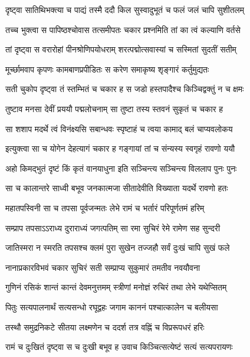 \twolineshloka
{दृष्ट्वा सातिथिभक्त्या च पाद्यं तस्मै ददौ किल}
{सुस्वादुभूतं च फलं जलं चापि सुशीतलम्} %

\twolineshloka
{तच्च भुक्त्वा स पापिष्ठश्चोवास तत्समीपतः}
{चकार प्रश्नमिति तां का त्वं कल्याणि वर्तसे} %

\twolineshloka
{तां दृष्ट्वा स वरारोहां पीनश्रोणिपयोधराम्}
{शरत्पद्मोत्सवास्यां च सस्मितां सुदतीं सतीम्} %

\twolineshloka
{मूर्च्छामवाप कृपणः कामबाणप्रपीडितः}
{स करेण समाकृष्य शृङ्‌गारं कर्तुमुद्यतः} %

\twolineshloka
{सती चुकोप दृष्ट्वा तं स्तम्भितं च चकार ह}
{स जडो हस्तपादैश्च किञ्चिद्वक्तुं न च क्षमः} %

\twolineshloka
{तुष्टाव मनसा देवीं प्रययौ पद्मलोचनाम्}
{सा तुष्टा तस्य स्तवनं सुकृतं च चकार ह} %

\twolineshloka
{सा शशाप मदर्थे त्वं विनंक्ष्यसि सबान्धवः}
{स्पृष्टाहं च त्वया कामाद्‌ बलं चाप्यवलोकय} %

\twolineshloka
{इत्युक्त्वा सा च योगेन देहत्यागं चकार ह}
{गङ्‌गायां तां च संन्यस्य स्वगृहं रावणो ययौ} %

\twolineshloka
{अहो किमद्‍भुतं दृष्टं किं कृतं वानयाधुना}
{इति सञ्चिन्त्य सञ्चिन्त्य विललाप पुनः पुनः} %

\twolineshloka
{सा च कालान्तरे साध्वी बभूव जनकात्मजा}
{सीतादेवीति विख्याता यदर्थे रावणो हतः} %

\twolineshloka
{महातपस्विनी सा च तपसा पूर्वजन्मतः}
{लेभे रामं च भर्तारं परिपूर्णतमं हरिम्} %

\twolineshloka
{सम्प्राप तपसाऽऽराध्य दुराराध्यं जगत्पतिम्}
{सा रमा सुचिरं रेमे रामेण सह सुन्दरी} %

\twolineshloka
{जातिस्मरा न स्मरति तपसश्च क्लमं पुरा}
{सुखेन तज्जहौ सर्वं दुःखं चापि सुखं फले} %

\twolineshloka
{नानाप्रकारविभवं चकार सुचिरं सती}
{सम्प्राप्य सुकुमारं तमतीव नवयौवना} %

\twolineshloka
{गुणिनं रसिकं शान्तं कान्तं देवमनुत्तमम्}
{स्त्रीणां मनोज्ञं रुचिरं तथा लेभे यथेप्सितम्} %

\twolineshloka
{पितुः सत्यपालनार्थं सत्यसन्धो रघूद्वहः}
{जगाम काननं पश्चात्कालेन च बलीयसा} %

\twolineshloka
{तस्थौ समुद्रनिकटे सीतया लक्ष्मणेन च}
{ददर्श तत्र वह्निं च विप्ररूपधरं हरिः} %

\twolineshloka
{रामं च दुःखितं दृष्ट्वा स च दुःखी बभूव ह}
{उवाच किञ्चित्सत्येष्टं सत्यं सत्यपरायणः} %



